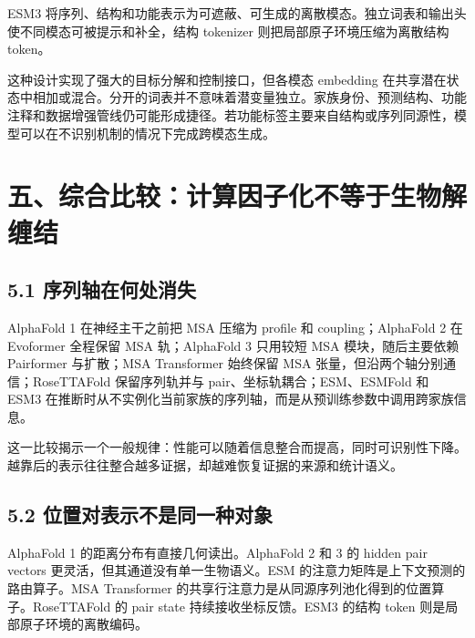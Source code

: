 \documentclass[10pt]{article}
\begin{document}

ESM3 将序列、结构和功能表示为可遮蔽、可生成的离散模态。独立词表和输出头使不同模态可被提示和补全，结构 tokenizer 则把局部原子环境压缩为离散结构 token。\par

这种设计实现了强大的目标分解和控制接口，但各模态 embedding 在共享潜在状态中相加或混合。分开的词表并不意味着潜变量独立。家族身份、预测结构、功能注释和数据增强管线仍可能形成捷径。若功能标签主要来自结构或序列同源性，模型可以在不识别机制的情况下完成跨模态生成。\par

\section*{五、综合比较：计算因子化不等于生物解缠结}


\subsection*{5.1 序列轴在何处消失}


AlphaFold 1 在神经主干之前把 MSA 压缩为 profile 和 coupling；AlphaFold 2 在 Evoformer 全程保留 MSA 轨；AlphaFold 3 只用较短 MSA 模块，随后主要依赖 Pairformer 与扩散；MSA Transformer 始终保留 MSA 张量，但沿两个轴分别通信；RoseTTAFold 保留序列轨并与 pair、坐标轨耦合；ESM、ESMFold 和 ESM3 在推断时从不实例化当前家族的序列轴，而是从预训练参数中调用跨家族信息。\par

这一比较揭示一个一般规律：性能可以随着信息整合而提高，同时可识别性下降。越靠后的表示往往整合越多证据，却越难恢复证据的来源和统计语义。\par

\subsection*{5.2 位置对表示不是同一种对象}


AlphaFold 1 的距离分布有直接几何读出。AlphaFold 2 和 3 的 hidden pair vectors 更灵活，但其通道没有单一生物语义。ESM 的注意力矩阵是上下文预测的路由算子。MSA Transformer 的共享行注意力是从同源序列池化得到的位置算子。RoseTTAFold 的 pair state 持续接收坐标反馈。ESM3 的结构 token 则是局部原子环境的离散编码。\par
\end{document}
